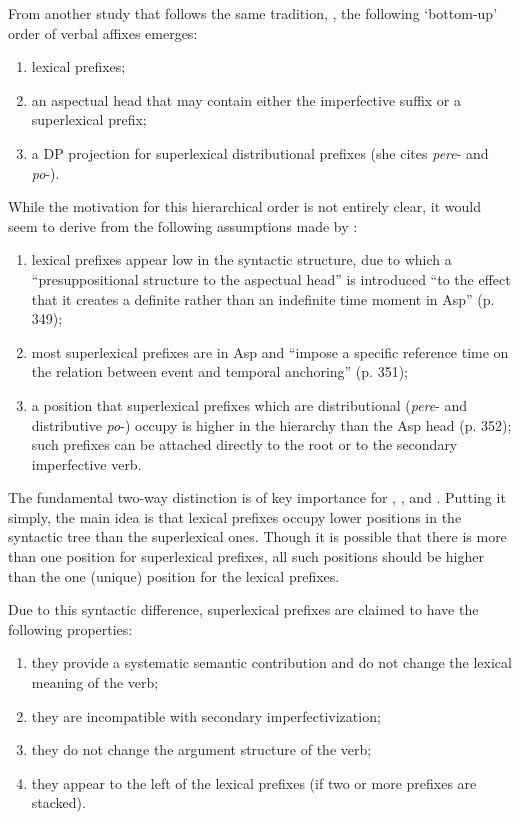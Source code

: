 From another study that follows the same tradition, \citealt{Ramchand:04}, the following `bottom-up' order of verbal affixes emerges:

\begin{enumerate}
\item lexical prefixes;
\item an aspectual head that may contain either the imperfective suffix or a superlexical prefix;
\item a DP projection for superlexical distributional prefixes (she cites \textit{pere}- and \textit{po}-). 
\end{enumerate}
While the motivation for this hierarchical order is not entirely clear, it would seem to derive from the following assumptions made by \citet{Ramchand:04}: 
\begin{enumerate}
\item lexical prefixes appear low in the syntactic structure, due to which a ``presuppositional structure to the aspectual head'' is introduced ``to the effect that it creates a definite rather than an indefinite time moment in Asp'' (p. 349);
\item most superlexical prefixes are in Asp and ``impose a specific reference time on the relation between event and temporal anchoring'' (p. 351);
\item a position that superlexical prefixes which are distributional (\textit{pere}- and distributive \textit{po}-) occupy is higher in the hierarchy than the Asp head (p. 352); such prefixes can be attached directly to the root or to the secondary imperfective verb.
\end{enumerate}
The fundamental two-way distinction is of key importance for \citet{Romanova:04}, \citet{Svenonius:04b}, and \citet{Ramchand:04}. Putting it simply, the main idea is that lexical prefixes occupy lower positions in the syntactic tree than the superlexical ones. Though it is possible that there is more than one position for superlexical prefixes, all such positions should be higher than the one (unique) position for the lexical prefixes. 

Due to this syntactic difference, superlexical prefixes are claimed to have the following properties:
\begin{enumerate}
\item they provide a systematic semantic contribution and do not change the lexical meaning of the verb;
\item they are incompatible with secondary imperfectivization;
\item they do not change the argument structure of the verb;
\item they appear to the left of the lexical prefixes (if two or more prefixes are stacked). 
\end{enumerate}

